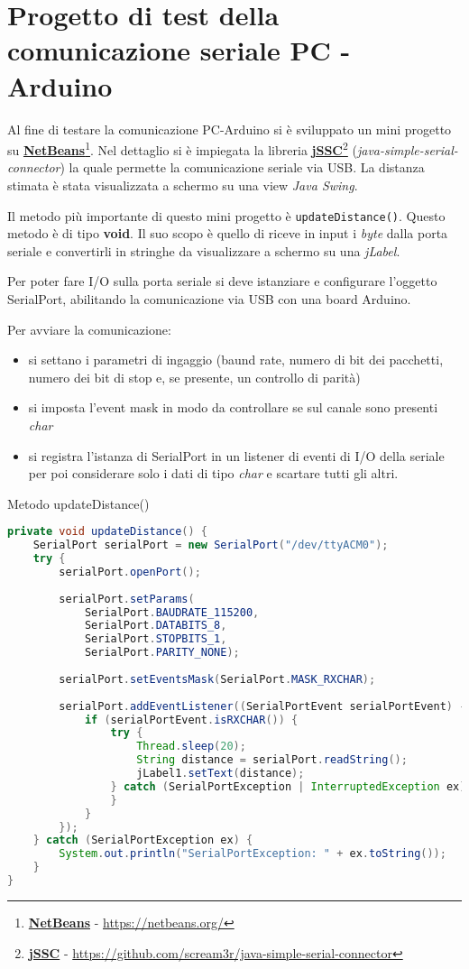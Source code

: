 \section{Progetto di test della comunicazione seriale PC - Arduino}
Al fine di testare la comunicazione PC-Arduino si è sviluppato un mini progetto su \href{https://netbeans.org/}{\textbf{NetBeans}}\footnote{\href{https://netbeans.org/}{\textbf{NetBeans}} - \url{https://netbeans.org/}}. Nel dettaglio si è impiegata la libreria \href{https://github.com/scream3r/java-simple-serial-connector}{\textbf{jSSC}}\footnote{\href{https://github.com/scream3r/java-simple-serial-connector}{\textbf{jSSC}} - \url{https://github.com/scream3r/java-simple-serial-connector}} (\textit{java-simple-serial-connector}) la quale permette la comunicazione seriale via USB. La distanza stimata è stata visualizzata a schermo su una view \textit{Java Swing}.

Il metodo più importante di questo mini progetto è \texttt{updateDistance()}. Questo metodo è di tipo \textbf{void}. Il suo scopo è quello di riceve in input i \textit{byte} dalla porta seriale e convertirli in stringhe da visualizzare a schermo su una \textit{jLabel}.

Per poter fare I/O sulla porta seriale si deve istanziare e configurare l'oggetto SerialPort, abilitando la comunicazione via USB con una board Arduino.

Per avviare la comunicazione:
\begin{itemize}
	\item si settano i parametri di ingaggio (baund rate, numero di bit dei pacchetti, numero dei bit di stop e, se presente, un controllo di parità)
	
	\item si imposta l'event mask in modo da controllare se sul canale sono presenti \textit{char}
	
	\item si registra l'istanza di SerialPort in un listener di eventi di I/O della seriale per poi considerare solo i dati di tipo \textit{char} e scartare tutti gli altri. 
\end{itemize}

Metodo updateDistance()
\begin{lstlisting}[language=Java]
private void updateDistance() {    
	SerialPort serialPort = new SerialPort("/dev/ttyACM0");
	try {
		serialPort.openPort();
		
		serialPort.setParams( 
			SerialPort.BAUDRATE_115200, 
			SerialPort.DATABITS_8, 
			SerialPort.STOPBITS_1,
			SerialPort.PARITY_NONE);
			
		serialPort.setEventsMask(SerialPort.MASK_RXCHAR);
		
		serialPort.addEventListener((SerialPortEvent serialPortEvent) -> {
			if (serialPortEvent.isRXCHAR()) {
				try {
					Thread.sleep(20);
					String distance = serialPort.readString();
					jLabel1.setText(distance);
				} catch (SerialPortException | InterruptedException ex) {
				}
			}
		});
	} catch (SerialPortException ex) {
		System.out.println("SerialPortException: " + ex.toString());
	}
}
\end{lstlisting}

